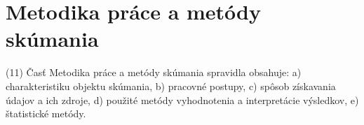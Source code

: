 \chapter{Metodika práce a metódy skúmania}
        (11) Časť Metodika práce a metódy skúmania spravidla obsahuje:
            a) charakteristiku objektu skúmania, 
            b) pracovné postupy, 
            c) spôsob získavania údajov a ich zdroje, 
            d) použité metódy vyhodnotenia a interpretácie výsledkov,
            e) štatistické metódy. 

 
